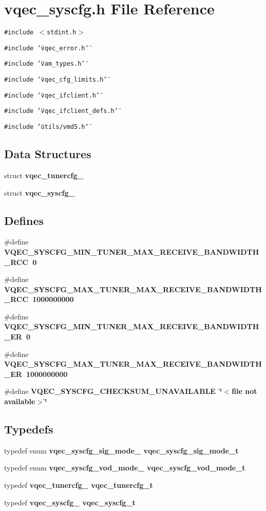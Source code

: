 \section{vqec\_\-syscfg.h File Reference}
\label{vqec__syscfg_8h}
{\tt \#include $<$stdint.h$>$}\par
{\tt \#include \char`\"{}vqec\_\-error.h\char`\"{}}\par
{\tt \#include \char`\"{}vam\_\-types.h\char`\"{}}\par
{\tt \#include \char`\"{}vqec\_\-cfg\_\-limits.h\char`\"{}}\par
{\tt \#include \char`\"{}vqec\_\-ifclient.h\char`\"{}}\par
{\tt \#include \char`\"{}vqec\_\-ifclient\_\-defs.h\char`\"{}}\par
{\tt \#include \char`\"{}utils/vmd5.h\char`\"{}}\par
\subsection*{Data Structures}
\begin{CompactItemize}
\item 
struct \bf{vqec\_\-tunercfg\_\-}
\item 
struct \bf{vqec\_\-syscfg\_\-}
\end{CompactItemize}
\subsection*{Defines}
\begin{CompactItemize}
\item 
\#define \bf{VQEC\_\-SYSCFG\_\-MIN\_\-TUNER\_\-MAX\_\-RECEIVE\_\-BANDWIDTH\_\-RCC}~0
\item 
\#define \bf{VQEC\_\-SYSCFG\_\-MAX\_\-TUNER\_\-MAX\_\-RECEIVE\_\-BANDWIDTH\_\-RCC}~1000000000
\item 
\#define \bf{VQEC\_\-SYSCFG\_\-MIN\_\-TUNER\_\-MAX\_\-RECEIVE\_\-BANDWIDTH\_\-ER}~0
\item 
\#define \bf{VQEC\_\-SYSCFG\_\-MAX\_\-TUNER\_\-MAX\_\-RECEIVE\_\-BANDWIDTH\_\-ER}~1000000000
\item 
\#define \bf{VQEC\_\-SYSCFG\_\-CHECKSUM\_\-UNAVAILABLE}~\char`\"{}$<$file not available$>$\char`\"{}
\end{CompactItemize}
\subsection*{Typedefs}
\begin{CompactItemize}
\item 
typedef enum \bf{vqec\_\-syscfg\_\-sig\_\-mode\_\-} \bf{vqec\_\-syscfg\_\-sig\_\-mode\_\-t}
\item 
typedef enum \bf{vqec\_\-syscfg\_\-vod\_\-mode\_\-} \bf{vqec\_\-syscfg\_\-vod\_\-mode\_\-t}
\item 
typedef \bf{vqec\_\-tunercfg\_\-} \bf{vqec\_\-tunercfg\_\-t}
\item 
typedef \bf{vqec\_\-syscfg\_\-} \bf{vqec\_\-syscfg\_\-t}
\end{CompactItemize}
